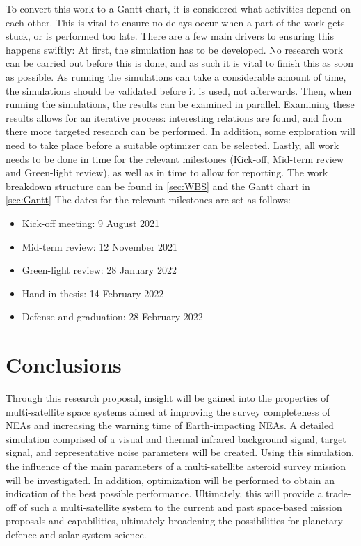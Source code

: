 \documentclass[12pt, english, NoHyper]{AE4010-template}
\begin{document}
To convert this work to a Gantt chart, it is considered what activities depend on each other. This is vital to ensure no delays occur when a part of the work gets stuck, or is performed too late. There are a few main drivers to ensuring this happens swiftly: At first, the simulation has to be developed. No research work can be carried out before this is done, and as such it is vital to finish this as soon as possible. As running the simulations can take a considerable amount of time, the simulations should be validated before it is used, not afterwards. Then, when running the simulations, the results can be examined in parallel. Examining these results allows for an iterative process: interesting relations are found, and from there more targeted research can be performed. In addition, some exploration will need to take place before a suitable optimizer can be selected. Lastly, all work needs to be done in time for the relevant milestones (Kick-off, Mid-term review and Green-light review), as well as in time to allow for reporting. The work breakdown structure can be found in \autoref{sec:WBS} and the Gantt chart in \autoref{sec:Gantt} The dates for the relevant milestones are set as follows:
\begin{itemize}
\setlength\itemsep{-0.5em}
 \item Kick-off meeting: 9 August 2021
 \item Mid-term review: 12 November 2021
 \item Green-light review: 28 January 2022
 \item Hand-in thesis: 14 February 2022
 \item Defense and graduation: 28 February 2022
\end{itemize}


\section{Conclusions}
Through this research proposal, insight will be gained into the properties of multi-satellite space systems aimed at improving the survey completeness of NEAs and increasing the warning time of Earth-impacting NEAs. A detailed simulation comprised of a visual and thermal infrared background signal, target signal, and representative noise parameters will be created. Using this simulation, the influence of the main parameters of a multi-satellite asteroid survey mission will be investigated. In addition, optimization will be performed to obtain an indication of the best possible performance. Ultimately, this will provide a trade-off of such a multi-satellite system to the current and past space-based mission proposals and capabilities, ultimately broadening the possibilities for planetary defence and solar system science.
\end{document}
